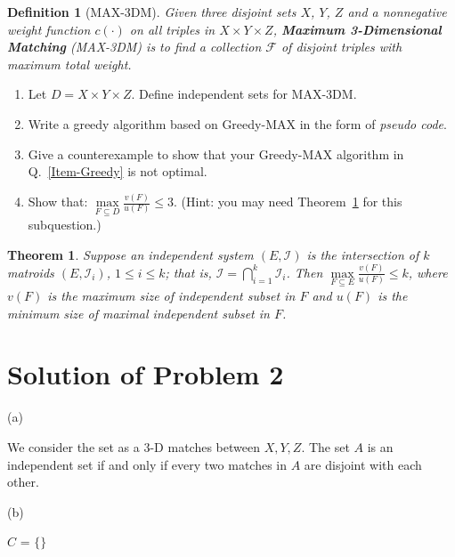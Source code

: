 \documentclass[12pt,a4paper]{article}
\newtheorem{theorem}{Theorem}
\newtheorem{definition}{Definition}
\theoremstyle{definition}
\begin{document}
\begin{enumerate}
    \begin{definition}[MAX-3DM] 
        Given three disjoint sets $X$, $Y$, $Z$ and a nonnegative weight function $c(\cdot)$ on all triples in $X \times Y \times Z$, \textbf{Maximum 3-Dimensional Matching} (MAX-3DM) is to find a collection $\mathcal{F}$ of disjoint triples with maximum total weight.
    \end{definition}

    \begin{enumerate}
    	\item Let $D = X \times Y \times Z$. Define independent sets for MAX-3DM.
    	\item Write a greedy algorithm based on Greedy-MAX in the form of \emph{pseudo code}. \label{Item-Greedy}
    	\item Give a counterexample to show that your Greedy-MAX algorithm in Q.~\ref{Item-Greedy} is not optimal.
    	\item Show that: $\max\limits_{F \subseteq D} \frac{v(F)}{u(F)} \leq 3$. {\color{blue}(Hint: you may need Theorem~\ref{Thm-Intersect} for this subquestion.)} 
    \end{enumerate}
    \begin{theorem} \label{Thm-Intersect}
        Suppose an independent system $(E, \mathcal{I})$ is the intersection of $k$ matroids $\left(E, \mathcal{I}_{i}\right)$, $1 \leq i \leq k$; that is, $\mathcal{I}=\bigcap_{i=1}^{k} \mathcal{I}_{i}$. Then $\max\limits_{F \subseteq E} \frac{v(F)}{u(F)} \leq k$, where $v(F)$ is the maximum size of independent subset in $F$ and $u(F)$ is the minimum size of maximal independent subset in $F$.
    \end{theorem}
 
	\section*{Solution of Problem 2}
	
	(a)
	
	We consider the set as a 3-D matches between $X, Y, Z$. The set $A$ is an independent set if and only if 
	every two matches in $A$ are disjoint with each other.



	(b)
	
	 \begin{minipage}[t]{0.90\textwidth}
		\begin{algorithm}[H]
		   $C$ = $\{ \}$


\end{algorithm}
\end{minipage}
\end{enumerate}
\end{document}
